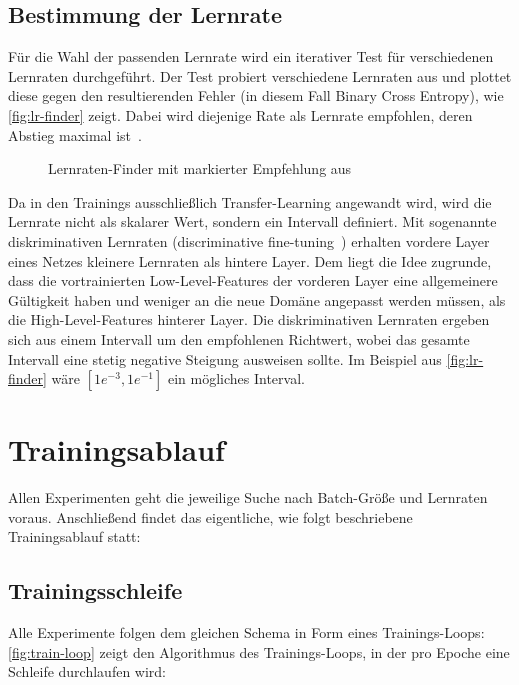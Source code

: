 \subsection{Bestimmung der Lernrate}
\label{subsec:vorkehrungen}

Für die Wahl der passenden Lernrate wird ein iterativer Test für verschiedenen Lernraten durchgeführt.
Der Test probiert verschiedene Lernraten aus und plottet diese gegen den resultierenden Fehler (in diesem Fall Binary Cross Entropy), wie \autoref{fig:lr-finder} zeigt.
Dabei wird diejenige Rate als Lernrate empfohlen, deren Abstieg maximal ist~\cite{Smith15}.

\begin{figure}
    \centering
    \caption{Lernraten-Finder mit markierter Empfehlung aus~\cite{Gugger20}}
    \label{fig:lr-finder}
\end{figure}

Da in den Trainings ausschließlich Transfer-Learning angewandt wird, wird die Lernrate nicht als skalarer Wert, sondern ein Intervall definiert.
Mit sogenannte diskriminativen Lernraten (discriminative fine-tuning~\cite{Howard18}) erhalten vordere Layer eines Netzes kleinere Lernraten als hintere Layer.
Dem liegt die Idee zugrunde, dass die vortrainierten Low-Level-Features der vorderen Layer eine allgemeinere Gültigkeit haben und weniger an die neue Domäne angepasst werden müssen, als die High-Level-Features hinterer Layer.
Die diskriminativen Lernraten ergeben sich aus einem Intervall um den empfohlenen Richtwert, wobei das gesamte Intervall eine stetig negative Steigung ausweisen sollte.
Im Beispiel aus \autoref{fig:lr-finder} wäre $[1e^{-3}, 1e^{-1}]$ ein mögliches Interval.

\section{Trainingsablauf}
\label{sec:trainingsablauf}

Allen Experimenten geht die jeweilige Suche nach Batch-Größe und Lernraten voraus.
Anschließend findet das eigentliche, wie folgt beschriebene Trainingsablauf statt:

\subsection{Trainingsschleife}
\label{subsec:trainingsschleife}

Alle Experimente folgen dem gleichen Schema in Form eines Trainings-Loops:
\autoref{fig:train-loop} zeigt den Algorithmus des Trainings-Loops, in der pro Epoche eine Schleife durchlaufen wird:

